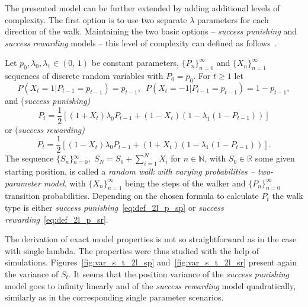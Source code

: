 \documentclass[runningheads]{CMSIM}
\begin{document}
    The presented model can be further extended by adding additional levels
    of complexity.
    The first option is to use two separate $\lambda$
    parameters for each direction of the walk.
    Maintaining the two basic
    options -- \emph{success punishing} and \emph{success rewarding} models --
    this level of complexity can defined as follows~\cite{ja2019apmat}.
    \begin{definition}
        Let $\ensuremath{p_{0},\lambda_{0},\lambda_{1}\in(0,\,1)}$ be constant
        parameters, ${\{P_{n}\}}_{n=0}^{\infty}$ and ${\{X_{n}\}}_{n=1}^{\infty}$
        sequences of discrete random variables with $P_{0}=p_{0}$.
        For $t\ge1$ let
        \[
            P(X_{t}=1|P_{t-1}=p_{t-1})=p_{t-1},\,\,\,P(X_{t}=-1|P_{t-1}=p_{t-1})=1-p_{t-1},
        \]
        and (\emph{success punishing)}
        \begin{equation}
            P_{t}=\frac{1}{2}[(1+X_{t})\lambda_{0}P_{t-1}+(1-X_{t})(1-\lambda_{1}(1-P_{t-1}))]\label{eq:def_2l_p_sp}
        \end{equation}
        or (\emph{success rewarding)}
        \begin{equation}
            P_{t}=\frac{1}{2}[(1-X_{t})\lambda_{0}P_{t-1}+(1+X_{t})(1-\lambda_{1}(1-P_{t-1}))].\label{eq:def_2l_p_sr}
        \end{equation}
        The sequence ${\{S_{n}\}}{}_{n=0}^{\infty},\;S_{N}=S_{0}+\sum_{i=1}^{N}X_{i}$
        for $n\in\mathbb{N}$, with $S_{0}\in\mathbb{R}$ some given starting
        position, is called a \emph{random walk with varying probabilities
        -- two-parameter model}, with ${\{X_{n}\}}_{n=1}^{\infty}$ being the
        steps of the walker and ${\{P_{n}\}}_{n=0}^{\infty}$ transition probabilities.
        Depending on the chosen formula to calculate $P_{t}$ the walk type
        is either \emph{success punishing}~\eqref{eq:def_2l_p_sp} or \emph{success
        rewarding}~\eqref{eq:def_2l_p_sr}.

        The derivation of exact model properties is not so straightforward
        as in the case with single lambda.
        The properties were thus studied
        with the help of simulations.
        Figures~\ref{fig:var_s_t_2l_sp} and~\ref{fig:var_s_t_2l_sr} present again the variance of $S_{t}$.
        It seems that the position variance of the \emph{success punishing}
        model goes to infinity linearly and of the \emph{success rewarding}
        model quadratically, similarly as in the corresponding single parameter
        scenarios.


\end{definition}
\end{document}
